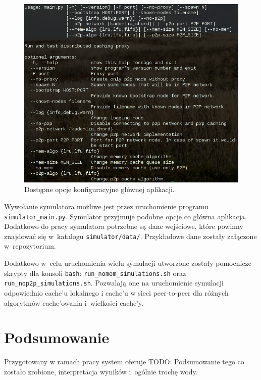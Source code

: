 \documentclass[a4paper,11pt]{scrartcl}
\newcommand{\f}{\texttt}
\newcommand{\s}{ }
\newcommand{\keszy}{cache'y}
\newcommand{\keszu}{cache'u}
\newcommand{\keszowania}{cache'owania}
\begin{document}
\begin{figure}[h]
\centering
\includegraphics[width=0.8\linewidth]{img/options.png}
\caption{Dostępne opcje konfiguracyjne głównej aplikacji.}
\label{fig_main_help}
\end{figure}

Wywołanie symulatora możliwe jest przez uruchomienie programu \f{simulator\_main.py}. Symulator przyjmuje podobne opcje co główna aplikacja. Dodatkowo do pracy symulatora potrzebne są dane wejściowe, które powinny znajdować się w~katalogu \f{simulator/data/}. Przykładowe dane zostały załączone w~repozytorium.

Dodatkowo w~celu uruchomienia wielu symulacji utworzone zostały pomocnicze skrypty dla konsoli \f{bash}: \f{run\_nomem\_simulations.sh} oraz \f{run\_nop2p\_simulations.sh}. Pozwalają one na uruchomienie symulacji odpowiednio \keszu\s lokalnego i \keszu\s w sieci peer-to-peer dla różnych algorytmów \keszowania\s i~wielkości \keszy.


\section{Podsumowanie}

Przygotowany w ramach pracy system oferuje
TODO: Podsumowanie tego co zostało zrobione, interpretacja wyników i~ogólnie trochę wody.




\end{document}

